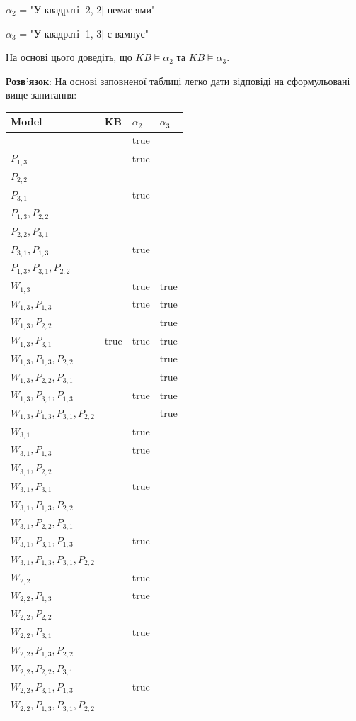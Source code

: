 \documentclass[a4paper,14pt]{extarticle} %
\begin{document}
$\alpha_2$ = "У квадраті [2, 2] немає ями"

$\alpha_3$ = "У квадраті [1, 3] є вампус"

На основі цього доведіть, що $KB \models \alpha_2$ та $KB \models \alpha_3$.

\textbf{Розв'язок}: На основі заповненої таблиці легко дати відповіді на
сформульовані вище запитання:

\begin{tabular}{|p{}|p{}|p{}|p{}|}
\hline
\textbf{Model} & \textbf{KB} & $\alpha_2$ & $\alpha_3$ \\
\hline
& & true & \\
$P_{1,3}$ & & true & \\
$P_{2,2}$ & & & \\
$P_{3,1}$ & & true & \\
$P_{1,3}, P_{2,2}$ & & & \\
$P_{2,2}, P_{3,1}$ & & & \\
$P_{3,1}, P_{1,3}$ & & true & \\
$P_{1,3}, P_{3,1}, P_{2,2}$ & & & \\
\hline
$W_{1,3}$ & & true & true \\
$W_{1,3}, P_{1,3}$ & & true & true \\
$W_{1,3}, P_{2,2}$ & & & true \\
$W_{1,3}, P_{3,1}$ & true & true & true \\
$W_{1,3}, P_{1,3}, P_{2,2}$ & & & true \\
$W_{1,3}, P_{2,2}, P_{3,1}$ & & & true \\
$W_{1,3}, P_{3,1}, P_{1,3}$ & & true & true \\
$W_{1,3}, P_{1,3}, P_{3,1}, P_{2,2}$ & & & true \\
\hline
$W_{3,1}$ & & true & \\
$W_{3,1}, P_{1,3}$ & & true & \\
$W_{3,1}, P_{2,2}$ & & & \\
$W_{3,1}, P_{3,1}$ & & true & \\
$W_{3,1}, P_{1,3}, P_{2,2}$ & & & \\
$W_{3,1}, P_{2,2}, P_{3,1}$ & & & \\
$W_{3,1}, P_{3,1}, P_{1,3}$ & & true & \\
$W_{3,1}, P_{1,3}, P_{3,1}, P_{2,2}$ & & & \\
\hline
$W_{2,2}$ & & true & \\
$W_{2,2}, P_{1,3}$ & & true & \\
$W_{2,2}, P_{2,2}$ & & & \\
$W_{2,2}, P_{3,1}$ & & true & \\
$W_{2,2}, P_{1,3}, P_{2,2}$ & & & \\
$W_{2,2}, P_{2,2}, P_{3,1}$ & & & \\
$W_{2,2}, P_{3,1}, P_{1,3}$ & & true & \\
$W_{2,2}, P_{1,3}, P_{3,1}, P_{2,2}$ & & & \\
\hline
\end{tabular}
\end{document}
